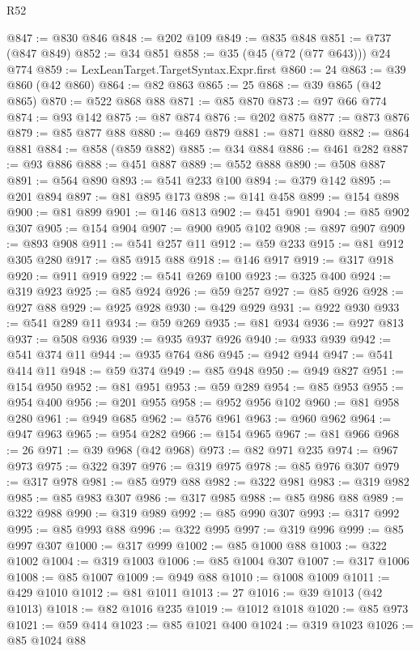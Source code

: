 \begin{lexlean}{R52}
\begin{coremodule}
@847 := @830 @846
@848 := @202 @109
@849 := @835 @848
@851 := @737 (@847 @849)
@852 := @34 @851
@858 := @35 (@45 (@72 (@77 @643))) @24 @774
@859 := LexLeanTarget.TargetSyntax.Expr.first
@860 := 24
@863 := @39 @860 (@42 @860)
@864 := @82 @863
@865 := 25
@868 := @39 @865 (@42 @865)
@870 := @522 @868 @88
@871 := @85 @870
@873 := @97 @66 @774
@874 := @93 @142
@875 := @87 @874
@876 := @202 @875
@877 := @873 @876
@879 := @85 @877 @88
@880 := @469 @879
@881 := @871 @880
@882 := @864 @881
@884 := @858 (@859 @882)
@885 := @34 @884
@886 := @461 @282
@887 := @93 @886
@888 := @451 @887
@889 := @552 @888
@890 := @508 @887
@891 := @564 @890
@893 := @541 @233 @100
@894 := @379 @142
@895 := @201 @894
@897 := @81 @895 @173
@898 := @141 @458
@899 := @154 @898
@900 := @81 @899
@901 := @146 @813
@902 := @451 @901
@904 := @85 @902 @307
@905 := @154 @904
@907 := @900 @905 @102
@908 := @897 @907
@909 := @893 @908
@911 := @541 @257 @11
@912 := @59 @233
@915 := @81 @912 @305 @280
@917 := @85 @915 @88
@918 := @146 @917
@919 := @317 @918
@920 := @911 @919
@922 := @541 @269 @100
@923 := @325 @400
@924 := @319 @923
@925 := @85 @924
@926 := @59 @257
@927 := @85 @926
@928 := @927 @88
@929 := @925 @928
@930 := @429 @929
@931 := @922 @930
@933 := @541 @289 @11
@934 := @59 @269
@935 := @81 @934
@936 := @927 @813
@937 := @508 @936
@939 := @935 @937 @926
@940 := @933 @939
@942 := @541 @374 @11
@944 := @935 @764 @86
@945 := @942 @944
@947 := @541 @414 @11
@948 := @59 @374
@949 := @85 @948
@950 := @949 @827
@951 := @154 @950
@952 := @81 @951
@953 := @59 @289
@954 := @85 @953
@955 := @954 @400
@956 := @201 @955
@958 := @952 @956 @102
@960 := @81 @958 @280
@961 := @949 @685
@962 := @576 @961
@963 := @960 @962
@964 := @947 @963
@965 := @954 @282
@966 := @154 @965
@967 := @81 @966
@968 := 26
@971 := @39 @968 (@42 @968)
@973 := @82 @971 @235
@974 := @967 @973
@975 := @322 @397
@976 := @319 @975
@978 := @85 @976 @307
@979 := @317 @978
@981 := @85 @979 @88
@982 := @322 @981
@983 := @319 @982
@985 := @85 @983 @307
@986 := @317 @985
@988 := @85 @986 @88
@989 := @322 @988
@990 := @319 @989
@992 := @85 @990 @307
@993 := @317 @992
@995 := @85 @993 @88
@996 := @322 @995
@997 := @319 @996
@999 := @85 @997 @307
@1000 := @317 @999
@1002 := @85 @1000 @88
@1003 := @322 @1002
@1004 := @319 @1003
@1006 := @85 @1004 @307
@1007 := @317 @1006
@1008 := @85 @1007
@1009 := @949 @88
@1010 := @1008 @1009
@1011 := @429 @1010
@1012 := @81 @1011
@1013 := 27
@1016 := @39 @1013 (@42 @1013)
@1018 := @82 @1016 @235
@1019 := @1012 @1018
@1020 := @85 @973
@1021 := @59 @414
@1023 := @85 @1021 @400
@1024 := @319 @1023
@1026 := @85 @1024 @88

\end{coremodule}
\end{lexlean}
